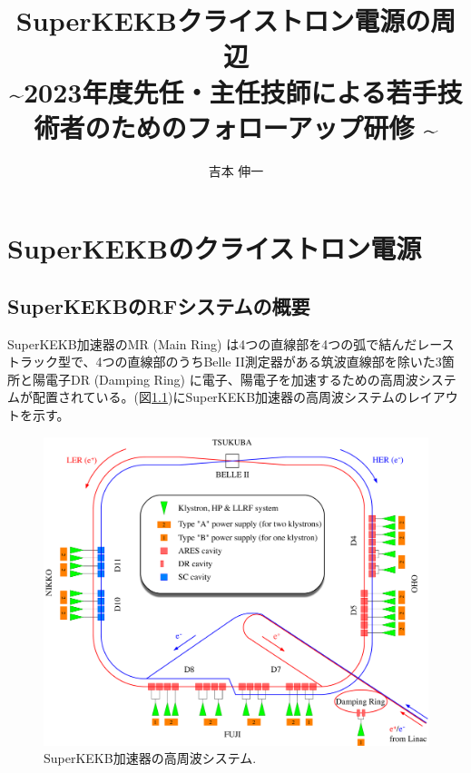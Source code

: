 \documentclass[book,openany]{jlreq}
\theoremstyle{definition}
\begin{document}
\title{\Large{SuperKEKBクライストロン電源の周辺}\\
    \normalsize{\textasciitilde 2023年度先任・主任技師による若手技術者のためのフォローアップ研修 \textasciitilde}}
\author{吉本 伸一}
\maketitle
\tableofcontents

\chapter{SuperKEKBのクライストロン電源}
\section{SuperKEKBのRFシステムの概要}

SuperKEKB加速器のMR (Main Ring) は4つの直線部を4つの弧で結んだレーストラック型で、4つの直線部のうちBelle II測定器がある筑波直線部を除いた3箇所と陽電子DR (Damping Ring) に電子、陽電子を加速するための高周波システムが配置されている。(図\ref{fig:layout})にSuperKEKB加速器の高周波システムのレイアウトを示す。
%
\begin{figure}[htbp]
    \begin{center}
        \includegraphics[width=\linewidth]{figs/SKEKB-RF.pdf}
        \caption{SuperKEKB加速器の高周波システム.}
        \label{fig:layout}
    \end{center}
\end{figure}
\end{document}
